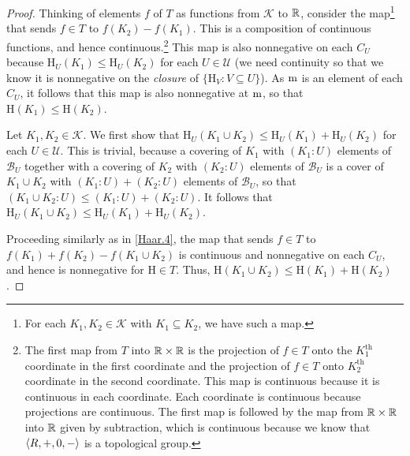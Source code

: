\begin{thm}
\begin{savenotes}
\begin{proof}
Thinking of elements $f$ of $T$ as functions from $\mathcal{K}$ to $\mathbb{R}$, consider the map\footnote{For each $K_1,K_2\in \mathcal{K}$ with $K_1\subseteq K_2$, we have such a map.} that sends $f\in T$ to $f(K_2)-f(K_1)$.  This is a composition of continuous functions, and hence continuous.\footnote{The first map from $T$ into $\mathbb{R} \times \mathbb{R}$ is the projection of $f\in T$ onto the $K_1^{\text{th}}$ coordinate in the first coordinate and the projection of $f\in T$ onto $K_2^{\text{th}}$ coordinate in the second coordinate.  This map is continuous because it is continuous in each coordinate.  Each coordinate is continuous because projections are continuous.  The first map is followed by the map from $\mathbb{R} \times \mathbb{R}$ into $\mathbb{R}$ given by subtraction, which is continuous because we know that $\langle R,+,0,-\rangle$ is a topological group.}  This map is also nonnegative on each $C_U$ because $\mathrm{H}_U(K_1)\leq \mathrm{H}_U(K_2)$ for each $U\in \mathcal{U}$ (we need continuity so that we know it is nonnegative on the \emph{closure} of $\{ \mathrm{H}_V:V\subseteq U\}$).  As $\mathrm{m}$ is an element of each $C_U$, it follows that this map is also nonnegative at $\mathrm{m}$, so that $\mathrm{H}(K_1)\leq \mathrm{H}(K_2)$.

\label{Haar.5}
Let $K_1,K_2\in \mathcal{K}$.  We first show that $\mathrm{H}_U(K_1\cup K_2)\leq \mathrm{H}_U(K_1)+\mathrm{H}_U(K_2)$ for each $U\in \mathcal{U}$.  This is trivial, because a covering of $K_1$ with $(K_1:U)$ elements of $\mathcal{B}_U$ together with a covering of $K_2$ with $(K_2:U)$ elements of $\mathcal{B}_U$ is a cover of $K_1\cup K_2$ with $(K_1:U)+(K_2:U)$ elements of $\mathcal{B}_U$, so that $(K_1\cup K_2:U)\leq (K_1:U)+(K_2:U)$.  It follows that $\mathrm{H}_U(K_1\cup K_2)\leq \mathrm{H}_U(K_1)+\mathrm{H}_U(K_2)$.

Proceeding similarly as in \cref{Haar.4}, the map that sends $f\in T$ to $f(K_1)+f(K_2)-f(K_1\cup K_2)$ is continuous and nonnegative on each $C_U$, and hence is nonnegative for $\mathrm{H}\in T$.  Thus, $\mathrm{H}(K_1\cup K_2)\leq \mathrm{H}(K_1)+\mathrm{H}(K_2)$.


\end{proof}
\end{savenotes}
\end{thm}
